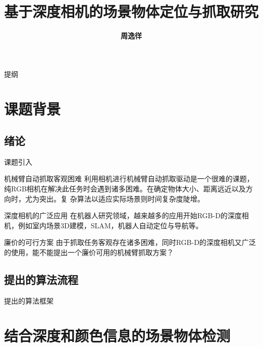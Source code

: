 \documentclass[xcolor=table,compress,blue]{beamer}
\title{\textbf{\Huge{基于深度相机的场景物体定位与抓取研究}}}
\institute{ 
	\textbf{\large{南京大学计算机科学与技术系}}
}
\author{\textbf{\huge{周逸徉}}}
\date{\tiny{}}
\begin{document}
\frame{
	\titlepage
	\thispagestyle{empty}
}
\begin{frame}[plain]{提纲}
	\vspace{-16pt}
	\textbf{\Large{\tableofcontents[hideallsubsections]}}
\end{frame}


%

\section{课题背景}
  \subsection{绪论}
	\begin{frame}{课题引入}
		\begin{exampleblock}{机械臂自动抓取客观困难}
			利用相机进行机械臂自动抓取驱动是一个很难的课题，纯RGB相机在解决此任务时会遇到诸多困难。在确定物体大小、距离远近以及方向时，尤为突出。复
			杂算法以适应实际场景则时间复杂度陡增。
		\end{exampleblock}
		\begin{exampleblock}{深度相机的广泛应用}
			在机器人研究领域，越来越多的应用开始RGB-D的深度相机，例如室内场景3D建模，SLAM，机器人自动定位与导航等。
		\end{exampleblock}
		\begin{exampleblock}{廉价的可行方案}
			由于抓取任务客观存在诸多困难，同时RGB-D的深度相机又广泛的使用，能不能提出一个廉价可用的机械臂抓取方案？
		\end{exampleblock}
	\end{frame}
	\subsection{提出的算法流程}
		\begin{frame}{提出的算法框架}
		\end{frame}	
  
\section{结合深度和颜色信息的场景物体检测}
\end{document}
